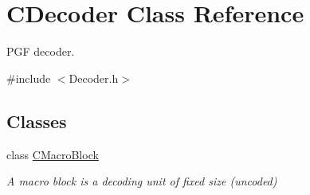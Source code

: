 \hypertarget{classCDecoder}{}\section{C\+Decoder Class Reference}
\label{classCDecoder}


P\+GF decoder.  




{\ttfamily \#include $<$Decoder.\+h$>$}

\subsection*{Classes}
\begin{DoxyCompactItemize}
\item 
class \mbox{\hyperlink{classCDecoder_1_1CMacroBlock}{C\+Macro\+Block}}
\begin{DoxyCompactList}\small\item\em A macro block is a decoding unit of fixed size (uncoded) \end{DoxyCompactList}\end{DoxyCompactItemize}
